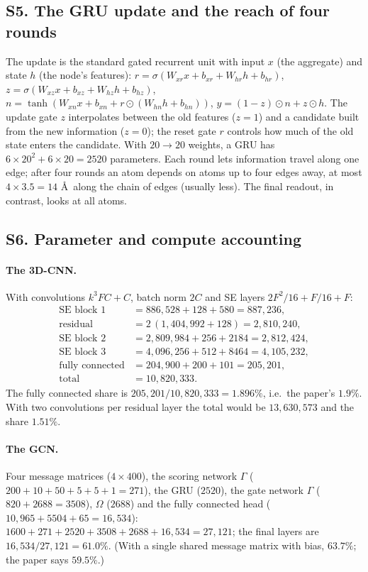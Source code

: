 \documentclass[11pt]{article}
\begin{document}
\label{sec:S5}
\subsection*{S5. The GRU update and the reach of four rounds}
The update is the standard gated recurrent unit with input $x$ (the aggregate) and state $h$ (the node's features): $r=\sigma(W_{xr}x+b_{xr}+W_{hr}h+b_{hr})$, $z=\sigma(W_{xz}x+b_{xz}+W_{hz}h+b_{hz})$, $n=\tanh(W_{xn}x+b_{xn}+r\odot(W_{hn}h+b_{hn}))$, $y=(1-z)\odot n+z\odot h$. The update gate $z$ interpolates between the old features ($z=1$) and a candidate built from the new information ($z=0$); the reset gate $r$ controls how much of the old state enters the candidate. With $20\to20$ weights, a GRU has $6\times20^2+6\times20=2520$ parameters. Each round lets information travel along one edge; after four rounds an atom depends on atoms up to four edges away, at most $4\times3.5=14$ \AA\ along the chain of edges (usually less). The final readout, in contrast, looks at all atoms.

\label{sec:S6}
\subsection*{S6. Parameter and compute accounting}
\paragraph{The 3D-CNN.} With convolutions $k^3FC+C$, batch norm $2C$ and SE layers $2F^2/16+F/16+F$:
\begin{align*}
  \text{SE block 1}&=886{,}528+128+580=887{,}236,\\
  \text{residual}&=2\,(1{,}404{,}992+128)=2{,}810{,}240,\\
  \text{SE block 2}&=2{,}809{,}984+256+2184=2{,}812{,}424,\\
  \text{SE block 3}&=4{,}096{,}256+512+8464=4{,}105{,}232,\\
  \text{fully connected}&=204{,}900+200+101=205{,}201,\\
  \text{total}&=10{,}820{,}333 .
\end{align*}
The fully connected share is $205{,}201/10{,}820{,}333=1.896\%$, i.e.\ the paper's $1.9\%$. With two convolutions per residual layer the total would be $13{,}630{,}573$ and the share $1.51\%$.

\paragraph{The GCN.} Four message matrices ($4\times400$), the scoring network $\Gamma$ ($200+10+50+5+5+1=271$), the GRU ($2520$), the gate network $\Gamma$ ($820+2688=3508$), $\Omega$ ($2688$) and the fully connected head ($10{,}965+5504+65=16{,}534$): $1600+271+2520+3508+2688+16{,}534=27{,}121$; the final layers are $16{,}534/27{,}121=61.0\%$. (With a single shared message matrix with bias, $63.7\%$; the paper says $59.5\%$.)
\end{document}
